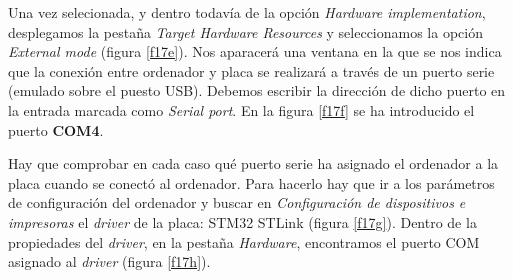 \documentclass[10pt,a4paper]{report}
\begin{document}
Una vez selecionada, y dentro todavía de la opción \emph{Hardware implementation}, desplegamos la pestaña \emph{Target Hardware Resources} y seleccionamos la opción \emph{External mode} (figura \ref{f17e}). Nos aparacerá una ventana en la que se nos indica que la conexión entre ordenador y placa se realizará a través de un puerto serie (emulado sobre el puesto USB). Debemos escribir la dirección de dicho puerto en la entrada marcada como \emph{Serial port}. En la figura \ref{f17f} se ha introducido el puerto \textbf{COM4}. 

Hay que comprobar en cada caso qué puerto serie ha asignado el ordenador a la placa cuando se conectó al ordenador. Para hacerlo hay que ir a los parámetros de configuración del ordenador y buscar en \emph{Configuración de dispositivos e impresoras} el \emph{driver} de la placa: STM32 STLink (figura \ref{f17g}). Dentro de la propiedades del \emph{driver}, en la pestaña \emph{Hardware}, encontramos el puerto COM asignado al \emph{driver} (figura \ref{f17h}).
\end{document}

